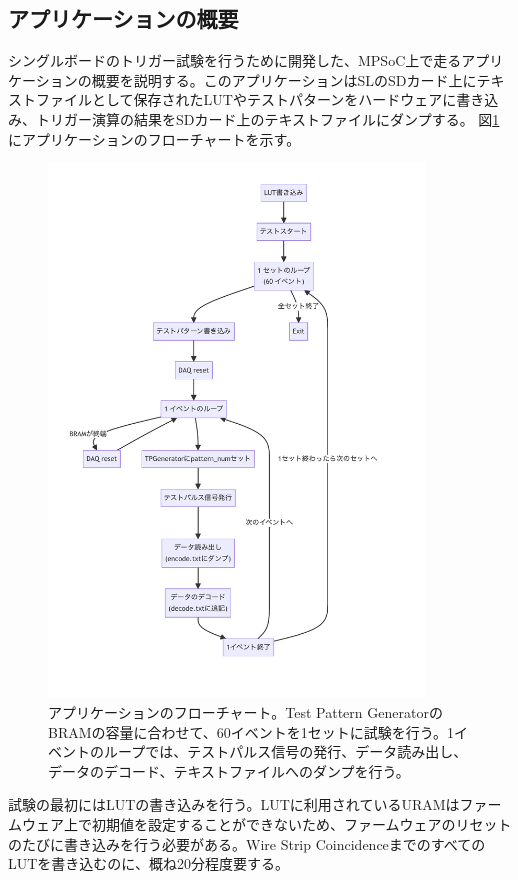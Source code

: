 \subsection*{アプリケーションの概要}
シングルボードのトリガー試験を行うために開発した、MPSoC上で走るアプリケーションの概要を説明する。このアプリケーションはSLのSDカード上にテキストファイルとして保存されたLUTやテストパターンをハードウェアに書き込み、トリガー演算の結果をSDカード上のテキストファイルにダンプする。
図\ref{Flowchart}にアプリケーションのフローチャートを示す。

\begin{figure} 
\centering
\includegraphics[width=10cm]{fig/Test/Flowchart.pdf}
\caption[アプケーションのフローチャート]{アプリケーションのフローチャート。Test Pattern GeneratorのBRAMの容量に合わせて、60イベントを1セットに試験を行う。1イベントのループでは、テストパルス信号の発行、データ読み出し、データのデコード、テキストファイルへのダンプを行う。}
\label{Flowchart}
\end{figure}

試験の最初にはLUTの書き込みを行う。LUTに利用されているURAMはファームウェア上で初期値を設定することができないため、ファームウェアのリセットのたびに書き込みを行う必要がある。Wire Strip CoincidenceまでのすべてのLUTを書き込むのに、概ね20分程度要する。

